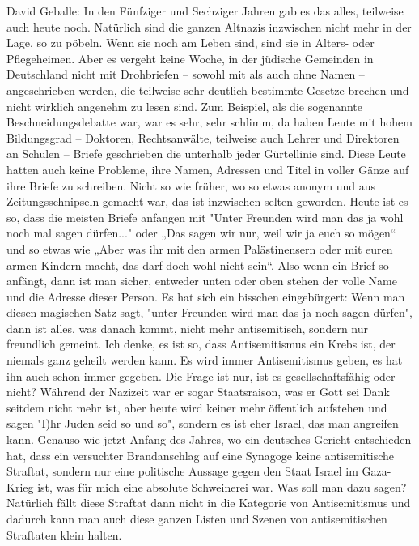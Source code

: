 David Geballe: In den Fünfziger und Sechziger Jahren gab es das alles, teilweise auch heute noch. Natürlich sind die ganzen Altnazis inzwischen nicht mehr in der Lage, so zu pöbeln. Wenn sie noch am Leben sind, sind sie in Alters- oder Pflegeheimen. Aber es vergeht keine Woche, in der jüdische Gemeinden in Deutschland nicht mit Drohbriefen – sowohl mit als auch ohne Namen – angeschrieben werden, die teilweise sehr deutlich bestimmte Gesetze brechen und nicht wirklich angenehm zu lesen sind. Zum Beispiel, als die sogenannte Beschneidungsdebatte war, war es sehr, sehr schlimm, da haben Leute mit hohem Bildungsgrad – Doktoren, Rechtsanwälte, teilweise auch Lehrer und Direktoren an Schulen – Briefe geschrieben die unterhalb jeder Gürtellinie sind. Diese Leute hatten auch keine Probleme, ihre Namen, Adressen und Titel in voller Gänze auf ihre Briefe zu schreiben. Nicht so wie früher, wo so etwas anonym und aus Zeitungsschnipseln gemacht war, das ist inzwischen selten geworden. Heute ist es so, dass die meisten Briefe anfangen mit "Unter Freunden wird man das ja wohl noch mal sagen dürfen..." oder „Das sagen wir nur, weil wir ja euch so mögen“ und so etwas wie „Aber was ihr mit den armen Palästinensern oder mit euren armen Kindern macht, das darf doch wohl nicht sein“. Also wenn ein Brief so anfängt, dann ist man sicher, entweder unten oder oben stehen der volle Name und die Adresse dieser Person. Es hat sich ein bisschen eingebürgert: Wenn man diesen magischen Satz sagt, "unter Freunden wird man das ja noch sagen dürfen", dann ist alles, was danach kommt, nicht mehr antisemitisch, sondern nur freundlich gemeint. 
Ich denke, es ist so, dass Antisemitismus ein Krebs ist, der niemals ganz geheilt werden kann. Es wird immer Antisemitismus geben, es hat ihn auch schon immer gegeben. Die Frage ist nur, ist es gesellschaftsfähig oder nicht? Während der Nazizeit war er sogar Staatsraison, was er Gott sei Dank seitdem nicht mehr ist, aber heute wird keiner mehr öffentlich aufstehen und sagen "I)hr Juden seid so und so", sondern es ist eher Israel, das man angreifen kann. Genauso wie jetzt Anfang des Jahres, wo ein deutsches Gericht entschieden hat, dass ein versuchter Brandanschlag auf eine Synagoge keine antisemitische Straftat, sondern nur eine politische Aussage gegen den Staat Israel im Gaza-Krieg ist, was für mich eine absolute Schweinerei war. Was soll man dazu sagen? Natürlich fällt diese Straftat dann nicht in die Kategorie von Antisemitismus und dadurch kann man auch diese ganzen Listen und Szenen von antisemitischen Straftaten klein halten. 


